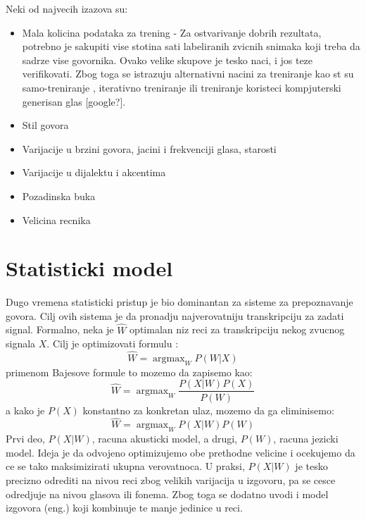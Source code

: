 \documentclass[a4paper]{article}
\DeclareMathOperator*{\argmax}{argmax}
\begin{document}
Neki od najvecih izazova su:
\begin{itemize}
  \item Mala kolicina podataka za trening - Za ostvarivanje dobrih rezultata, potrebno je sakupiti vise stotina sati labeliranih zvicnih snimaka koji treba da sadrze vise govornika. Ovako velike skupove je tesko naci, i jos teze verifikovati. Zbog toga se istrazuju alternativni nacini za treniranje kao st su samo-treniranje \cite{baevski2020wav2vec}, iterativno treniranje \cite{park2020noisy} ili treniranje koristeci kompjuterski generisan glas [google?]. %
  \item Stil govora %
  \item Varijacije u brzini govora, jacini i frekvenciji glasa, starosti %
  \item Varijacije u dijalektu i akcentima
  \item Pozadinska buka
  \item Velicina recnika
\end{itemize}

\section{Statisticki model}
Dugo vremena statisticki pristup je bio dominantan za sisteme za prepoznavanje govora.
Cilj ovih sistema je da pronadju najverovatniju transkripciju za zadati signal.
Formalno, neka je $\hat{W}$ optimalan niz reci za transkripciju nekog zvucnog signala $X$. Cilj je optimizovati formulu \cite{kamath2019nlp}:
\begin{equation*}
  \hat{W} = \argmax_{W} P(W|X)
\end{equation*}
primenom Bajesove formule to mozemo da zapisemo kao:
\begin{equation*}
  \hat{W} = \argmax_{W} \frac{P(X|W) P(X)}{P(W)}
\end{equation*}
a kako je $P(X)$ konstantno za konkretan ulaz, mozemo da ga eliminisemo:
\begin{equation*}
  \hat{W} = \argmax_{W} P(X|W) P(W)
\end{equation*}
Prvi deo, $P(X|W)$, racuna akusticki model, a drugi, $P(W)$, racuna jezicki model.
Ideja je da odvojeno optimizujemo obe prethodne velicine i ocekujemo da ce se tako maksimizirati ukupna verovatnoca.
U praksi, $P(X|W)$ je tesko precizno odrediti na nivou reci zbog velikih varijacija u izgovoru, pa se cesce odredjuje na nivou glasova ili fonema.
Zbog toga se dodatno uvodi i model izgovora (eng.) koji kombinuje te manje jedinice u reci. 
\end{document}
